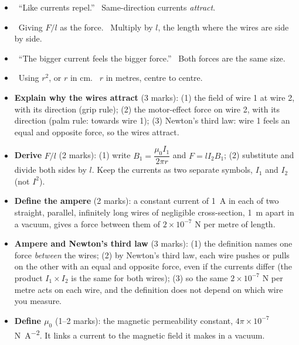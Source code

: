 \begin{mistakes}
\begin{itemize}
  \item \xmark\ ``Like currents repel.'' \cmark\ Same-direction currents \emph{attract}.
  \item \xmark\ Giving $F/l$ as the force. \cmark\ Multiply by $l$, the length where the wires are
        side by side.
  \item \xmark\ ``The bigger current feels the bigger force.'' \cmark\ Both forces are the same size.
  \item \xmark\ Using $r^2$, or $r$ in cm. \cmark\ $r$ in metres, centre to centre.
\end{itemize}
\end{mistakes}

\begin{examtip}[breakable]
\begin{itemize}
  \item \textbf{Explain why the wires attract} (3 marks): (1) the field of wire 1 at wire 2, with
        its direction (grip rule); (2) the motor-effect force on wire 2, with its direction (palm
        rule: towards wire 1); (3) Newton's third law: wire 1 feels an equal and opposite force,
        so the wires attract.
  \item \textbf{Derive} $F/l$ (2 marks): (1) write $B_1 = \dfrac{\mu_0 I_1}{2\pi r}$ and
        $F = lI_2B_1$; (2) substitute and divide both sides by $l$. Keep the currents as two
        separate symbols, $I_1$ and $I_2$ (not $I^2$).
  \item \textbf{Define the ampere} (2 marks): a constant current of \qty{1}{A} in each of two
        straight, parallel, infinitely long wires of negligible cross-section, \qty{1}{m} apart
        in a vacuum, gives
        a force between them of $2 \times 10^{-7}$ N per metre of length.
  \item \textbf{Ampere and Newton's third law} (3 marks): (1) the definition names one force
        \emph{between} the wires; (2) by Newton's third law, each wire pushes or pulls on the other
        with an equal and opposite force, even if the currents differ (the product
        $I_1 \times I_2$ is the same for both wires); (3) so the same $2 \times 10^{-7}$ N per
        metre acts on each wire, and the definition does not depend on which wire you measure.
  \item \textbf{Define $\mu_0$} (1--2 marks): the magnetic permeability constant,
        $4\pi \times 10^{-7}$ \si{N.A^{-2}}. It links a current to the magnetic field it makes in
        a vacuum.
\end{itemize}
\end{examtip}

